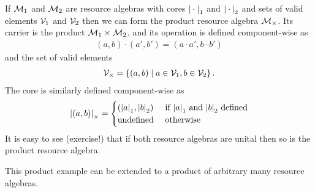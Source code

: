 \begin{example}
  If $\mathcal{M}_1$ and $\mathcal{M}_2$ are resource algebras with cores ${\mid}\cdot{\mid}_1$ and ${\mid}\cdot{\mid}_2$ and sets of valid elements $\mathcal{V}_1$ and $\mathcal{V}_2$ then we can form the product resource algebra $\mathcal{M}_\times$.
  Its carrier is the product $\mathcal{M}_1 \times \mathcal{M}_2$, and its operation is defined component-wise as
  \begin{align*}
    (a, b) \cdot (a', b') = (a \cdot a', b \cdot b')
  \end{align*}
  and the set of valid elements
  \begin{align*}
    \Vl_\times = \left\{(a, b) \isetsep a \in \Vl_1, b \in \Vl_2\right\}.
  \end{align*}
  The core is similarly defined component-wise as
  \begin{align*}
    {\mid}(a, b){\mid}_\times =
    \begin{cases}
      \left({\mid}a{\mid}_1, {\mid}b{\mid}_2\right) & \text{ if } {\mid}a{\mid}_1 \text{ and } {\mid}b{\mid}_2 \text{ defined}\\
      \text{undefined} & \text{ otherwise }
    \end{cases}
  \end{align*}
  It is easy to see (exercise!) that if both resource algebras are unital then so is the product resource algebra.

  This product example can be extended to a product of arbitrary many resource algebras.
\end{example}

